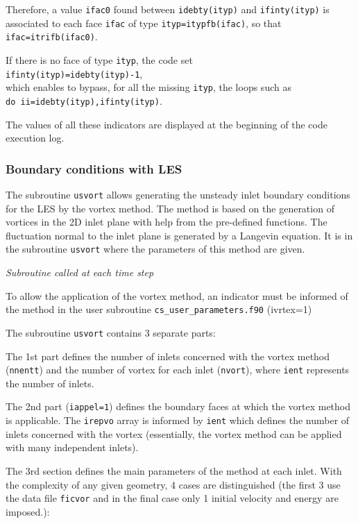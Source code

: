 {{{Therefore, a value \texttt{ifac0} found between \texttt{idebty(ityp)} and
\texttt{ifinty(ityp)} is associated to each face \texttt{ifac} of type
\texttt{ityp=itypfb(ifac)}, so that \texttt{ifac=itrifb(ifac0)}.

If there is no face of type \texttt{ityp}, the code set \\
\texttt{ifinty(ityp)=idebty(ityp)-1},\\
which enables to bypass, for all the missing \texttt{ityp}, the loops such as \\
\texttt{do ii=idebty(ityp),ifinty(ityp)}.

The values of all these indicators are displayed at the beginning of the
code execution log.

\subsubsection[Boundary conditions with LES]
{Boundary conditions with LES}
\label{sec:prg_usvort}%
The subroutine \texttt{usvort} allows generating the unsteady inlet boundary
conditions for the LES by the vortex method. The method is based on
 the generation of vortices in the 2D inlet plane with help from
the pre-defined functions. The fluctuation normal to the inlet plane
is generated by a Langevin equation. It is in the subroutine \texttt{usvort}
 where the parameters of this method are given.

\noindent
\textit{Subroutine called at each time step}

To allow the application of the vortex method, an indicator must be informed of
the method in the user subroutine \texttt{cs\_user\_parameters.f90} (ivrtex=1)

The subroutine \texttt{usvort} contains 3 separate parts:

\begin{list}{-}{}
\item The 1st part defines the number of inlets concerned with the vortex
method (\texttt{nnentt}) and the number of vortex for each inlet
(\texttt{nvort}), where \texttt{ient} represents the number of inlets.
\item The 2nd part (\texttt{iappel=1}) defines the boundary faces at which the
      vortex method is applicable. The \texttt{irepvo} array is informed
      by \texttt{ient} which defines the number of inlets concerned with the vortex
(essentially, the vortex method can be applied with many independent inlets).
\item The 3rd section defines the main parameters of the method at each inlet.
      With the complexity of any given geometry, 4 cases are distinguished
      (the first 3 use the data file \texttt{ficvor} and in the final case only 1
      initial velocity and energy are imposed.):


\end{list}}}}
